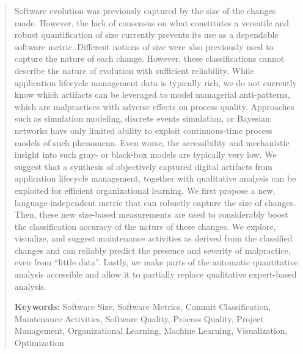 \begin{abstract}
{%
Software evolution was previously captured by the size of the changes made.
However, the lack of consensus on what constitutes a versatile and robust quantification of size currently prevents its use as a dependable software metric.
Different notions of size were also previously used to capture the nature of each change.
However, these classifications cannot describe the nature of evolution with sufficient reliability.
While application lifecycle management data is typically rich, we do not currently know which artifacts can be leveraged to model managerial anti-patterns, which are malpractices with adverse effects on process quality.
Approaches such as simulation modeling, discrete events simulation, or Bayesian networks have only limited ability to exploit continuous-time process models of such phenomena.
Even worse, the accessibility and mechanistic insight into such gray- or black-box models are typically very low.
%
We suggest that a synthesis of objectively captured digital artifacts from application lifecycle management, together with qualitative analysis can be exploited for efficient organizational learning.
We first propose a new, language-independent metric that can robustly capture the size of changes.
Then, these new size-based measurements are used to considerably boost the classification accuracy of the nature of these changes.
We explore, visualize, and suggest maintenance activities as derived from the classified changes and can reliably predict the presence and severity of malpractice, even from ``little data''.
Lastly, we make parts of the automatic quantitative analysis accessible and allow it to partially replace qualitative expert-based analysis.





}
\bigskip
\vfill
\noindent
\textbf{Keywords:}
Software Size, Software Metrics, Commit Classification, Maintenance Activities, Software Quality, Process Quality, Project Management, Organizational Learning, Machine Learning, Visualization, Optimization

\end{abstract}
\cleardoublepage


